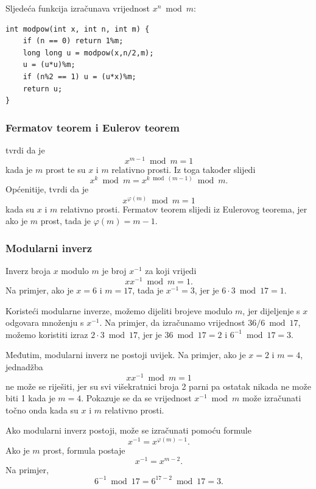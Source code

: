 Sljedeća funkcija izračunava vrijednost
$x^n \bmod m$:

\begin{lstlisting}
int modpow(int x, int n, int m) {
    if (n == 0) return 1%m;
    long long u = modpow(x,n/2,m);
    u = (u*u)%m;
    if (n%2 == 1) u = (u*x)%m;
    return u;
}
\end{lstlisting}

\subsubsection{Fermatov teorem i Eulerov teorem}


tvrdi da je
\[x^{m-1} \bmod m = 1\]
kada je $m$ prost te su $x$ i $m$ relativno prosti.
Iz toga također slijedi
\[x^k \bmod m = x^{k \bmod (m-1)} \bmod m.\]
Općenitije, 
tvrdi da je
\[x^{\varphi(m)} \bmod m = 1\]
kada su $x$ i $m$ relativno prosti.
Fermatov teorem slijedi iz Eulerovog teorema,
jer ako je $m$ prost, tada je $\varphi(m)=m-1$.

\subsubsection{Modularni inverz}


Inverz broja $x$ modulo $m$
je broj $x^{-1}$ za koji vrijedi
\[ x x^{-1} \bmod m = 1. \]
Na primjer, ako je $x=6$ i $m=17$,
tada je $x^{-1}=3$, jer je $6\cdot3 \bmod 17=1$.

Koristeći modularne inverze, možemo dijeliti brojeve
modulo $m$, jer dijeljenje s $x$
odgovara množenju s $x^{-1}$.
Na primjer, da izračunamo vrijednost $36/6 \bmod 17$,
možemo koristiti izraz $2 \cdot 3 \bmod 17$,
jer je $36 \bmod 17 = 2$ i $6^{-1} \bmod 17 = 3$.

Međutim, modularni inverz ne postoji uvijek.
Na primjer, ako je $x=2$ i $m=4$, jednadžba
\[ x x^{-1} \bmod m = 1 \]
ne može se riješiti, jer su svi višekratnici broja 2
parni pa ostatak nikada ne može biti 1 kada je $m=4$.
Pokazuje se da se vrijednost $x^{-1} \bmod m$
može izračunati točno onda kada su $x$ i $m$ relativno prosti.

Ako modularni inverz postoji, može se
izračunati pomoću formule
\[
x^{-1} = x^{\varphi(m)-1}.
\]
Ako je $m$ prost, formula postaje
\[
x^{-1} = x^{m-2}.
\]
Na primjer,
\[6^{-1} \bmod 17 =6^{17-2} \bmod 17 = 3.\]

